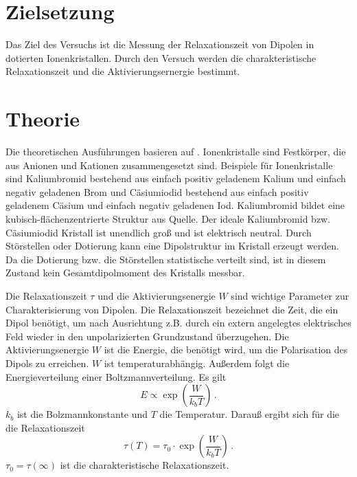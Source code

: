 \section{Zielsetzung}
\label{sec:Zielsetzung}
Das Ziel des Versuchs ist die Messung der Relaxationszeit von Dipolen in dotierten Ionenkristallen. Durch den Versuch werden die charakteristische Relaxationszeit und die Aktivierungsernergie bestimmt. 
\section{Theorie}
\label{sec:Theorie}
Die theoretischen Ausführungen basieren auf \cite{Fuller}. 
\label{Ionenkristallle} 
Ionenkristalle sind Festkörper, die aus Anionen und Kationen zusammengesetzt sind. Beispiele für Ionenkristalle sind Kaliumbromid bestehend aus einfach positiv geladenem Kalium und einfach negativ geladenen Brom und Cäsiumiodid bestehend aus einfach positiv geladenem Cäsium und einfach negativ geladenen Iod. Kaliumbromid bildet eine kubisch-flächenzentrierte Struktur aus Quelle. Der ideale Kaliumbromid bzw. Cäsiumiodid Kristall ist unendlich groß und ist elektrisch neutral. Durch Störstellen oder Dotierung kann eine Dipolstruktur im Kristall erzeugt werden. Da die Dotierung bzw. die Störstellen statistische verteilt sind, ist in diesem Zustand kein Gesamtdipolmoment des Kristalls messbar. 

\label{Relaxationszeit und Aktivierungsenergie}
Die Relaxationszeit $\tau$ und die Aktivierungsenergie $W$ sind wichtige Parameter zur Charakterisierung von Dipolen. Die Relaxationszeit bezeichnet die Zeit, die ein Dipol benötigt, um nach Ausrichtung z.B. durch ein extern angelegtes elektrisches Feld wieder in den unpolarizierten Grundzustand überzugehen. Die Aktivierungsenergie $W$ ist die Energie, die benötigt wird, um die Polarisation des Dipols zu erreichen. $W$ ist temperaturabhängig. Außerdem folgt die Energieverteilung einer Boltzmannverteilung. Es gilt 
\begin{equation}
    E \propto \exp{\left( \frac{W}{k_b T}\right)} \, .
\end{equation}
$k_b$ ist die Bolzmannkonstante und $T$ die Temperatur. Darauß ergibt sich für die die Relaxationszeit 
\begin{equation*}
    \tau(T) = \tau_0 \cdot \exp{\left( \frac{W}{k_b T}\right)} \, .
\end{equation*}
$\tau_0 = \tau(\infty)$ ist die charakteristische Relaxationszeit. 

